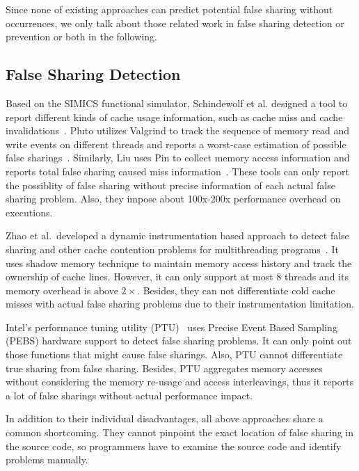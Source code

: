 \label{sec:relatedwork}

Since none of existing approaches can predict potential false sharing without occurrences, 
we only talk about those related work in false sharing detection or prevention or both in the following.

\subsection{False Sharing Detection}
Based on the SIMICS functional simulator, Schindewolf et al. designed a tool 
to report different kinds of cache usage information,
such as cache miss and cache invalidations~\cite{falseshare:simulator}.
Pluto utilizes Valgrind to track the sequence of memory read and write
events on different threads and reports a worst-case estimation of
possible false sharings~\cite{falseshare:binaryinstrumentation1}.
Similarly, Liu uses Pin to collect memory access information and
reports total false sharing caused miss information~\cite{falseshare:binaryinstrumentation2}.
These tools can only report the possiblity of false sharing without precise information of each
actual false sharing problem.  
Also, they impose about 100x-200x performance overhead on executions.  

Zhao et al.\ developed a dynamic instrumentation based approach to 
detect false sharing and other cache contention problems
for multithreading programs~\cite{qinzhaodetection}. 
It uses shadow memory technique to maintain memory access history and track the ownership of 
cache lines. 
However, it can only support at most $8$ threads and its memory overhead 
is above $2\times$. Besides, they can not differentiate cold cache misses with 
actual false sharing problems due to their instrumentation limitation. 

Intel's performance tuning utility (PTU)~\cite{detect:ptu, detect:intel} uses Precise
Event Based Sampling (PEBS) hardware support to detect false sharing problems. 
It can only point out those functions that might cause false sharings.
Also, PTU cannot differentiate true sharing from
false sharing. Besides, PTU aggregates memory accesses without considering the memory re-usage and
access interleavings, thus it reports a lot of
false sharings without actual performance impact.

In addition to their individual disadvantages,
all above approaches share a common shortcoming. 
They cannot pinpoint the exact location of false sharing in the source code, 
so programmers have to examine the source code and identify problems manually.

